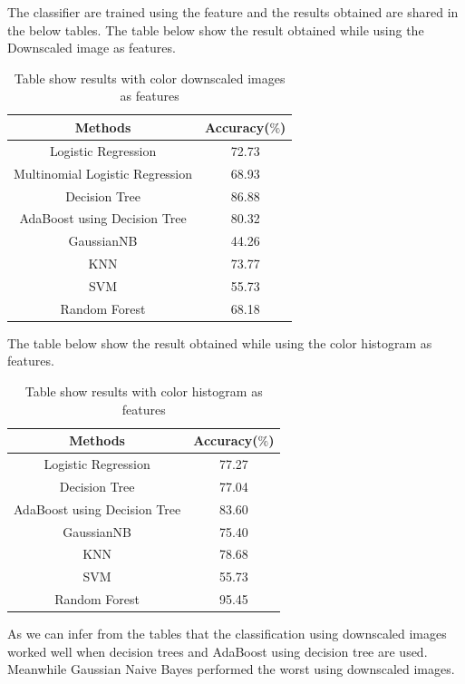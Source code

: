 \documentclass[journal]{IEEEtran}
\begin{document}
The classifier are trained using the feature and the results obtained are shared in the below tables.
The table below show the result obtained while using the Downscaled image as features.
\begin{center}
\begin{table}[h!]
\centering
\begin{tabular}{ |c|c| } 
 \hline
 \rowcolor{gray}
 Methods & Accuracy($\%$)  \\ 
 \hline
 Logistic Regression & 72.73 \\
 \hline
 Multinomial Logistic Regression & 68.93\\
 \hline
 Decision Tree & 86.88 \\ 
 \hline
 AdaBoost using Decision Tree & 80.32  \\ 
 \hline
 GaussianNB & 44.26 \\
 \hline
 KNN & 73.77\\
 \hline
 SVM & 55.73\\
 \hline
 Random Forest & 68.18\\
 \hline
\end{tabular}
\caption{Table show results with color downscaled images as features}
\label{table:1}
\end{table}
\end{center}

The table below show the result obtained while using the color histogram as features.
\begin{center}
\begin{table}[h!]
\centering
\begin{tabular}{ |c|c| } 
 \hline
 \rowcolor{gray}
 Methods & Accuracy($\%$)  \\ 
 \hline
 Logistic Regression & 77.27\\
 \hline
 Decision Tree & 77.04 \\ 
 \hline
 AdaBoost using Decision Tree & 83.60  \\ 
 \hline
 GaussianNB & 75.40 \\
 \hline
 KNN & 78.68\\
 \hline
 SVM & 55.73\\
 \hline
 Random Forest & 95.45\\
 \hline
\end{tabular}
\caption{Table show results with color histogram as features}
\label{table:1}
\end{table}
\end{center}

As we can infer from the tables that the classification using downscaled images worked well when decision trees and AdaBoost using decision tree are used. Meanwhile Gaussian Naive Bayes performed the worst using downscaled images.
\end{document}
